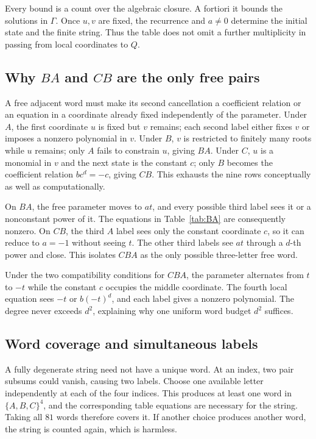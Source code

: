 \documentclass[11pt]{article}
\theoremstyle{definition}
\begin{document}
Every bound is a count over the algebraic closure. A fortiori it bounds the solutions in \(\Gamma\). Once \(u,v\) are fixed, the recurrence and \(a\neq0\) determine the initial state and the finite string. Thus the table does not omit a further multiplicity in passing from local coordinates to \(Q\).

\subsection{Why \texorpdfstring{\(BA\)}{BA} and \texorpdfstring{\(CB\)}{CB} are the only free pairs}

A free adjacent word must make its second cancellation a coefficient relation or an equation in a coordinate already fixed independently of the parameter. Under \(A\), the first coordinate \(u\) is fixed but \(v\) remains; each second label either fixes \(v\) or imposes a nonzero polynomial in \(v\). Under \(B\), \(v\) is restricted to finitely many roots while \(u\) remains; only \(A\) fails to constrain \(u\), giving \(BA\). Under \(C\), \(u\) is a monomial in \(v\) and the next state is the constant \(c\); only \(B\) becomes the coefficient relation \(bc^d=-c\), giving \(CB\). This exhausts the nine rows conceptually as well as computationally.

On \(BA\), the free parameter moves to \(at\), and every possible third label sees it or a nonconstant power of it. The equations in Table~\ref{tab:BA} are consequently nonzero. On \(CB\), the third \(A\) label sees only the constant coordinate \(c\), so it can reduce to \(a=-1\) without seeing \(t\). The other third labels see \(at\) through a \(d\)-th power and close. This isolates \(CBA\) as the only possible three-letter free word.

Under the two compatibility conditions for \(CBA\), the parameter alternates from \(t\) to \(-t\) while the constant \(c\) occupies the middle coordinate. The fourth local equation sees \(-t\) or \(b(-t)^d\), and each label gives a nonzero polynomial. The degree never exceeds \(d^2\), explaining why one uniform word budget \(d^2\) suffices.

\subsection{Word coverage and simultaneous labels}

A fully degenerate string need not have a unique word. At an index, two pair subsums could vanish, causing two labels. Choose one available letter independently at each of the four indices. This produces at least one word in \(\{A,B,C\}^4\), and the corresponding table equations are necessary for the string. Taking all \(81\) words therefore covers it. If another choice produces another word, the string is counted again, which is harmless.
\end{document}
